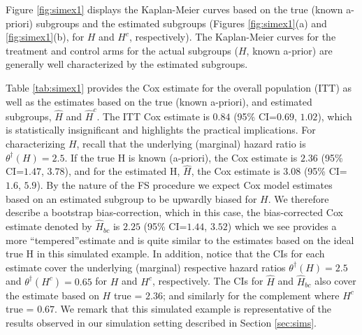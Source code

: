 \documentclass[smallextended]{svjour3}
\def\hplim{\theta^{\dagger}(H)}
\def\hcplim{\theta^{\dagger}(H^{c})}
\begin{document}
Figure \ref{fig:simex1} displays the Kaplan-Meier curves based on the true (known a-priori) subgroups and the estimated subgroups (Figures \ref{fig:simex1}(a) and \ref{fig:simex1}(b), for $H$ and $H^{c}$, respectively).  The Kaplan-Meier curves for the treatment and control arms for the actual subgroups ($H$, known a-prior) are generally well characterized by the estimated subgroups.  


Table \ref{tab:simex1} provides the Cox estimate for the overall population (ITT) as well as the estimates based on the true (known a-priori), and estimated subgroups, $\hat{H}$ and $\hat{H}^{c}$.  The ITT Cox estimate is $0.84$ (95\% CI=$0.69$, $1.02$), 
which is statistically insignificant and highlights the practical implications.  For characterizing $H$, recall that the underlying (marginal) hazard ratio is $\hplim =2.5$.  If the true H is known (a-priori), the Cox estimate is $2.36$ (95\% CI=$1.47$, $3.78$), and for the estimated H, $\hat{H}$, the Cox estimate is $3.08$ (95\% CI=$1.6$, 
$5.9$).  By the nature of the FS procedure we expect Cox model estimates based on an estimated subgroup to be upwardly biased for $H$.  We therefore describe a bootstrap bias-correction, which in this case, the bias-corrected Cox estimate denoted by $\hat{H}_{bc}$ is $2.25$ (95\% CI=$1.44$, $3.52$) which we see provides a more ``tempered''estimate and is quite similar to the estimates based on the ideal true H in this simulated example.  
In addition, notice that the CIs for each estimate cover the underlying (marginal) respective hazard ratios 
$\hplim =2.5$ and $\hcplim =0.65$ for $H$ and $H^{c}$, respectively.  
The CIs for $\hat{H}$ and $\hat{H}_{bc}$ also cover the estimate based on $H$ true =  $2.36$; and similarly for the complement where $H^{c}$ true =  $0.67$.  We remark that this simulated example is representative of the results observed in our simulation setting described in Section \ref{sec:sims}.





\end{document}
